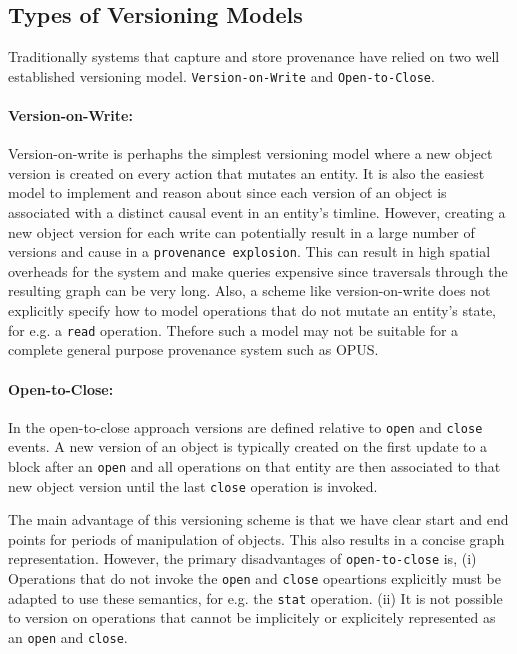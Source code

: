 \documentclass[withindex,glossary]{cam-thesis}
\begin{document}
\subsection{Types of Versioning Models}
Traditionally systems that capture and store provenance have relied on two well established versioning model.
\texttt{Version-on-Write} and \texttt{Open-to-Close}.

\paragraph{Version-on-Write:}
Version-on-write is perhaphs the simplest versioning model where a new object version is created on every action that mutates an entity.
It is also the easiest model to implement and reason about since each version of an object is associated with a distinct causal event in an entity's timline.
However, creating a new object version for each write can potentially result in a large number of versions and cause in a \texttt{provenance explosion}.
This can result in high spatial overheads for the system and make queries expensive since traversals through the resulting graph can be very long.
Also, a scheme like version-on-write does not explicitly specify how to model operations that do not mutate an entity's state, for e.g. a \texttt{read} operation.
Thefore such a model may not be suitable for a complete general purpose provenance system such as OPUS.

\paragraph{Open-to-Close:}
In the open-to-close approach versions are defined relative to \texttt{open} and \texttt{close} events.
A new version of an object is typically created on the first update to a block after an \texttt{open} and all operations on that entity are then associated to that new object version until the last \texttt{close} operation is invoked.

The main advantage of this versioning scheme is that we have clear start and end points for periods of manipulation of objects.
This also results in a concise graph representation.
However, the primary disadvantages of \texttt{open-to-close} is,
(i) Operations that do not invoke the \texttt{open} and \texttt{close} opeartions explicitly must be adapted to use these semantics, for e.g. the \texttt{stat} operation.
(ii) It is not possible to version on operations that cannot be implicitely or explicitely represented as an \texttt{open} and \texttt{close}.
\end{document}
